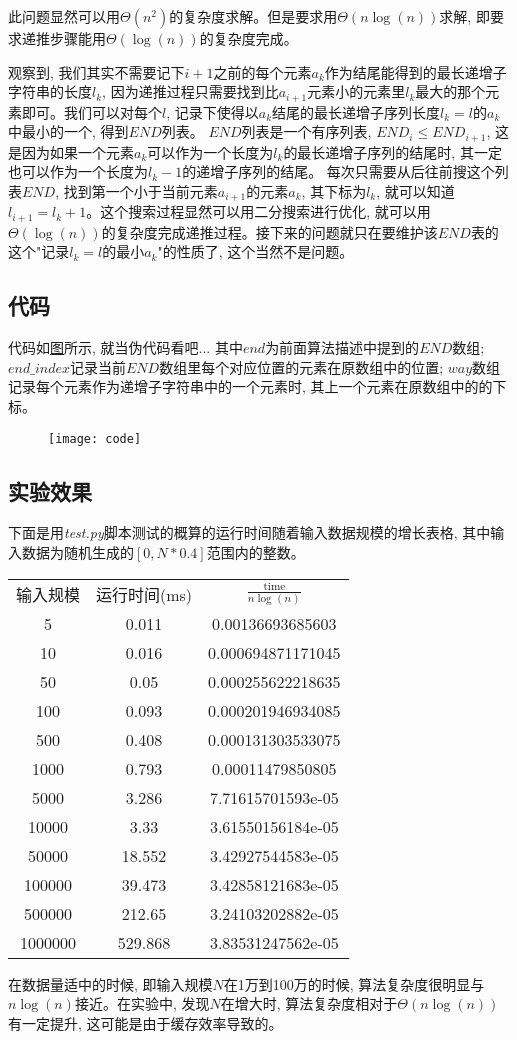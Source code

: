 \documentclass[paper=a4, fontsize=11pt]{scrartcl} %
\numberwithin{equation}{section} %
\numberwithin{figure}{section} %
\numberwithin{table}{section} %
\begin{document}
此问题显然可以用$\Theta(n^2)$的复杂度求解。但是要求用$\Theta(n \log(n))$求解, 即要求递推步骤能用$\Theta(\log(n))$的复杂度完成。

观察到, 我们其实不需要记下$i+1$之前的每个元素$a_k$作为结尾能得到的最长递增子字符串的长度$l_k$, 因为递推过程只需要找到比$a_{i+1}$元素小的元素里$l_k$最大的那个元素即可。我们可以对每个$l$, 记录下使得以$a_k$结尾的最长递增子序列长度$l_k = l$的$a_k$中最小的一个, 得到$END$列表。 $END$列表是一个有序列表, $END_i \leq END_{i+1}$, 这是因为如果一个元素$a_k$可以作为一个长度为$l_k$的最长递增子序列的结尾时, 其一定也可以作为一个长度为$l_ k - 1$的递增子序列的结尾。 每次只需要从后往前搜这个列表$END$, 找到第一个小于当前元素$a_{i+1}$的元素$a_k$, 其下标为$l_k$, 就可以知道$l_{i+1} = l_k + 1$。这个搜索过程显然可以用二分搜索进行优化, 就可以用$\Theta(\log(n))$的复杂度完成递推过程。接下来的问题就只在要维护该$END$表的这个"记录$l_k = l$的最小$a_k$"的性质了, 这个当然不是问题。

\subsection{代码}
代码如\hyperref[pic:1]{图}所示, 就当伪代码看吧... 其中$end$为前面算法描述中提到的$END$数组; $end\_index$记录当前$END$数组里每个对应位置的元素在原数组中的位置; $way$数组记录每个元素作为递增子字符串中的一个元素时, 其上一个元素在原数组中的的下标。

\begin{figure}
  \centering%
  \texttt{[image: code]}
  \label{pic:1}
\end{figure}

\subsection{实验效果}
下面是用\textit{test.py}脚本测试的概算的运行时间随着输入数据规模的增长表格, 其中输入数据为随机生成的$[0, N * 0.4]$范围内的整数。

\begin{center}
\begin{tabular}{ c | c | c }
  输入规模 & 运行时间(ms) & $\frac{\mbox{time}}{n\log(n)}$ \\
  5 & 0.011 & 0.00136693685603\\
  10 & 0.016 & 0.000694871171045\\
  50 & 0.05 & 0.000255622218635\\
  100 & 0.093 & 0.000201946934085\\
  500 & 0.408 & 0.000131303533075\\
  1000 & 0.793 & 0.00011479850805\\
  5000 & 3.286 & 7.71615701593e-05\\
  10000 & 3.33 & 3.61550156184e-05\\
  50000 & 18.552 & 3.42927544583e-05\\
  100000 & 39.473 & 3.42858121683e-05\\
  500000 & 212.65 & 3.24103202882e-05\\
  1000000 & 529.868 & 3.83531247562e-05
\end{tabular}
\end{center}

在数据量适中的时候, 即输入规模$N$在1万到100万的时候, 算法复杂度很明显与$n\log(n)$接近。在实验中, 发现$N$在增大时, 算法复杂度相对于$\Theta(n\log(n))$有一定提升, 这可能是由于缓存效率导致的。
\end{document}
